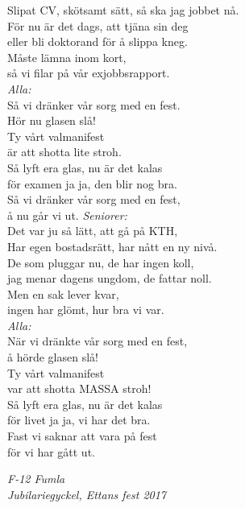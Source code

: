 \documentclass[a6paper,10pt]{article}
\begin{document}
Slipat CV, skötsamt sätt, så ska jag jobbet nå. \\
För nu är det dags, att tjäna sin deg \\
eller bli doktorand för å slippa kneg. \\
Måste lämna inom kort,  \\
så vi filar på vår exjobbsrapport.
\vspace{5pt} \\
\textit{Alla:} \\
Så vi dränker vår sorg med en fest. \\
Hör nu glasen slå! \\
Ty vårt valmanifest \\
är att shotta lite stroh. \\
Så lyft era glas, nu är det kalas \\
för examen ja ja, den blir nog bra. \\
Så vi dränker vår sorg med en fest, \\
å nu går vi ut.
\newpage
\setlength{\oddsidemargin}{-0.47in}
\noindent
\textit{Seniorer:} \\
Det var ju så lätt, att gå på KTH, \\
Har egen bostadsrätt, har nått en ny nivå. \\
De som pluggar nu, de har ingen koll, \\
jag menar dagens ungdom, de fattar noll. \\
Men en sak lever kvar,  \\
ingen har glömt, hur bra vi var.
\vspace{5pt} \\
\textit{Alla:} \\
När vi dränkte vår sorg med en fest, \\
å hörde glasen slå! \\
Ty vårt valmanifest \\
var att shotta MASSA stroh! \\
Så lyft era glas, nu är det kalas \\
för livet ja ja, vi har det bra. \\
Fast vi saknar att vara på fest \\
för vi har gått ut.

\begin{flushright}
\textit{F-12 Fumla \\ Jubilariegyckel, Ettans fest 2017}
\end{flushright}
\end{document}
